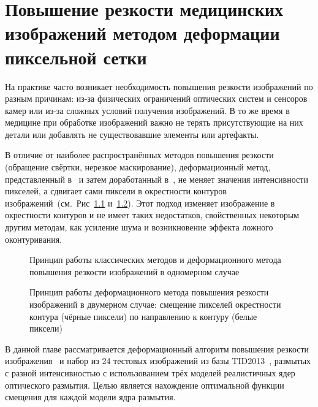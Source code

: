 \chapter{Повышение резкости медицинских изображений методом деформации пиксельной сетки}\label{ch:ch2}

На практике часто возникает необходимость повышения резкости изображений по разным причинам: из-за физических ограничений оптических систем и сенсоров камер или из-за сложных условий получения изображений. В то же время в медицине при обработке изображений важно не терять присутствующие на них детали или добавлять не существовавшие элементы или артефакты.

В отличие от наиболее распространённых методов повышения резкости (обращение свёртки, нерезкое маскирование), деформационный метод, представленный в~\cite{krylov2014gridwarping} и затем доработанный в~\cite{nasonova2014deblurred, gusev2016parallel}, не меняет значения интенсивности пикселей, а сдвигает сами пиксели в окрестности контуров изображений~(см.~Рис~\ref{fig:warping-warping-idea} и~\ref{fig:warp-idea}). Этот подход изменяет изображение в окрестности контуров и не имеет таких недостатков, свойственных некоторым другим методам, как усиление шума и возникновение эффекта ложного оконтуривания.

\begin{figure}[ht]
	\caption{Принцип работы классических методов и деформационного метода повышения резкости изображений в одномерном случае}
	\label{fig:warping-warping-idea}
\end{figure}

\begin{figure}[ht]
	\caption{Принцип работы деформационного метода повышения резкости изображений в двумерном случае: смещение пикселей окрестности контура (чёрные пиксели) по направлению к контуру (белые пиксели)}
	\label{fig:warp-idea}
\end{figure}

В данной главе рассматривается деформационный алгоритм повышения резкости изображения~\cite{nasonova2014deblurred, gusev2016parallel} и набор из 24 тестовых изображений из базы TID2013~\cite{ponomarenko2015image}, размытых с разной интенсивностью с использованием трёх моделей реалистичных ядер оптического размытия. Целью является нахождение оптимальной функции смещения для каждой модели ядра размытия.%

